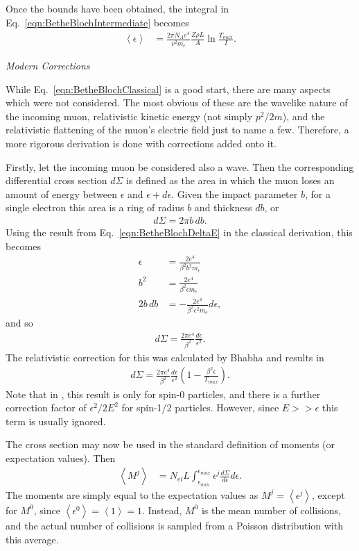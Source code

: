 Once the bounds have been obtained, the integral in Eq.~\eqref{eqn:BetheBlochIntermediate} becomes
\begin{align}
\left<\epsilon\right> &= \frac{2\pi N_A e^4}{v^2 m_e} \frac{Z\rho L}{A} \ln{\frac{T_{max}}{I}} \label{eqn:BetheBlochClassical}.
\end{align}

\noindent \textit{\large{Modern Corrections}}

\iffalse
While Eq.~\eqref{eqn:BetheBlochClassical} is a good start, there are many aspects which were not considered. The most obvious of these are the wavelike nature of the incoming muon, relativistic kinetic energy (not simply $p^2/2m$), and the relativistic flattening of the muon's electric field just to name a few. Therefore, a more rigorous derivation is done with corrections added onto it.

Firstly, let the incoming muon be considered also a wave. Then the corresponding differential cross section $d\Sigma$ is defined as the area in which the muon loses an amount of energy between $\epsilon$ and $\epsilon+d\epsilon$. Given the impact parameter $b$, for a single electron this area is a ring of radius $b$ and thickness $db$, or \cite{bichsel1968,bichsel1988}
\begin{align*}
d\Sigma=2\pi b \, db.
\end{align*}
Using the result from Eq.~\eqref{eqn:BetheBlochDeltaE} in the classical derivation, this becomes
\begin{align*}
\epsilon &= \frac{2e^4}{\beta^2 b^2 m_e}\\
b^2 &= \frac{2e^4}{\beta^2 \epsilon m_e}\\
2b \, db &= -\frac{2e^4}{\beta^2 \epsilon^2 m_e}d\epsilon,
\end{align*}
and so
\begin{align*}
d\Sigma=\frac{2\pi e^4}{\beta^2} \frac{d\epsilon}{\epsilon ^2}.
\end{align*}
The relativistic correction for this was calculated by Bhabha \cite{uehling,bhabha} and results in
\begin{align*}
d\Sigma=\frac{2\pi e^4}{\beta^2} \frac{d\epsilon}{\epsilon ^2}\left(1-\frac{\beta^2 \epsilon}{T_{max}}\right).
\end{align*}
Note that in \cite{uehling}, this result is only for spin-0 particles, and there is a further correction factor of $\epsilon ^2 / 2E^2$ for spin-1/2 particles. However, since $E>>\epsilon$ this term is usually ignored.

The cross section may now be used in the standard definition of moments (or expectation values). Then
\begin{align} \label{eqn:StragglingMoments}
\left< M^j\right>&=N_{el} L \int_{\epsilon_{min}} ^{\epsilon_{max}} \epsilon^j \frac{d\Sigma}{d\epsilon} d\epsilon .
\end{align}
The moments are simply equal to the expectation values as $M^j=\left<\epsilon ^j \right>$, except for $M^0$, since $\left< \epsilon ^0 \right>=\left< 1 \right> = 1$. Instead, $M^0$ is the mean number of collisions, and the actual number of collisions is sampled from a Poisson distribution with this average.

